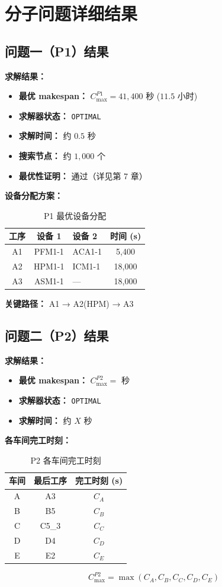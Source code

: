 \documentclass[UTF8,a4paper,12pt]{ctexart}
\begin{document}
\section{分子问题详细结果}
\subsection{问题一（P1）结果}
\textbf{求解结果：}
\begin{itemize}
  \item \textbf{最优 makespan：} $C_{\max}^{P1} = 41,400$ 秒 ($11.5$ 小时)
  \item \textbf{求解器状态：} \texttt{OPTIMAL}
  \item \textbf{求解时间：} 约 $0.5$ 秒
  \item \textbf{搜索节点：} 约 $1,000$ 个
  \item \textbf{最优性证明：} 通过（详见第 7 章）
\end{itemize}

\textbf{设备分配方案：}
\begin{table}[htbp]
  \centering
  \caption{P1 最优设备分配}
  \label{tab:p1_device_assign}
  \begin{tabular}{cclc}
    \toprule
    工序 & 设备 1 & 设备 2 & 时间 (s) \\
    \midrule
    A1 & PFM1-1 & ACA1-1 & 5,400 \\
    A2 & HPM1-1 & ICM1-1 & 18,000 \\
    A3 & ASM1-1 & — & 18,000 \\
    \bottomrule
  \end{tabular}
\end{table}

\textbf{关键路径：} A1 → A2(HPM) → A3

\subsection{问题二（P2）结果}
\textbf{求解结果：}
\begin{itemize}
  \item \textbf{最优 makespan：} $C_{\max}^{P2} =$ 秒
  \item \textbf{求解器状态：} \texttt{OPTIMAL}
  \item \textbf{求解时间：} 约 $X$ 秒
\end{itemize}

\textbf{各车间完工时刻：}
\begin{table}[htbp]
  \centering
  \caption{P2 各车间完工时刻}
  \label{tab:p2_shop_completion}
  \begin{tabular}{ccc}
    \toprule
    车间 & 最后工序 & 完工时刻 (s) \\
    \midrule
    A & A3 & $C_A$ \\
    B & B5 & $C_B$ \\
    C & C5\_3 & $C_C$ \\
    D & D4 & $C_D$ \\
    E & E2 & $C_E$ \\
    \bottomrule
  \end{tabular}
\end{table}
$$C_{\max}^{P2} = \max(C_A, C_B, C_C, C_D, C_E)$$
\end{document}
